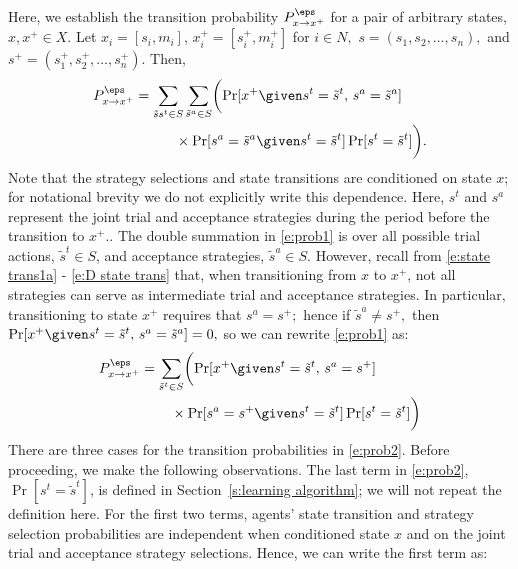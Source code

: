 Here, we establish the transition probability $P^\eps_{x\to x^+}$ for a pair of arbitrary states, $x,x^+\in X.$ %
 Let $x_i = [s_i,m_i]$, $x_i ^+= [s_i^+,m_i^+]$ for $i\in N,$  $s = (s_1,s_2,\ldots,s_n),$  and $s^+ = (s_1^+,s_2^+,\ldots,s_n^+).$ Then,
\begin{align}
P^\eps_{x\to x^+} 
&=\sum_{\tilde{s}s^t\in S}\sum_{\tilde{s}^a\in S}\biggl(\Pr[x^+\given s^t = \tilde{s}^t,\, s^a = \tilde{s}^a]\nonumber\\
&\hspace{.4in}\times\Pr[s^a = \tilde{s}^a \given s^t = \tilde{s}^t]\Pr[s^t = \tilde{s}^t]\biggr).\label{e:prob1}
\end{align}
Note that the strategy selections and state transitions are conditioned on state $x$; for notational brevity we do not explicitly write this dependence. Here, $s^t$ and $s^a$ represent the joint trial and acceptance strategies during the period before the transition to $x^+.$. The double summation in \eqref{e:prob1} is over all possible trial actions, $\tilde{s}^t\in S$, and acceptance strategies, $\tilde{s}^a\in S$. However, recall from \eqref{e:state trans1a} - \eqref{e:D state trans} that, when transitioning from $x$ to $x^+$, not all strategies can serve as intermediate trial and acceptance strategies. In particular, transitioning to state $x^+$ requires that $s^a = s^+;$ hence if $\tilde{s}^a\neq s^+,$ then
$\Pr[x^+\given s^t = \tilde{s}^t,\, s^a = \tilde{s}^a]=0,$ 
so we can rewrite \eqref{e:prob1} as:
\begin{align}
P^\eps_{x\to x^+}
& = \sum_{\tilde{s}^t\in S}\biggl(\Pr[x^+\given s^t = \tilde{s}^t,\, s^a = s^+]\nonumber\\
&\hspace{.3in} \times\Pr[ s^a = s^+\given s^t = \tilde{s}^t]\Pr[ s^t = \tilde{s}^t]\biggr)\label{e:prob2}
\end{align}
There are three cases for the transition probabilities in \eqref{e:prob2}. Before proceeding, we make the following observations. The last term in \eqref{e:prob2}, $\Pr[ s^t = \tilde{s}^t]$, is defined in Section~\ref{s:learning algorithm}; we will not repeat the definition here. For the first two terms, agents' state transition and strategy selection probabilities are independent when conditioned state $x$ and on the joint trial and acceptance strategy selections. Hence, we can write the first term as:

